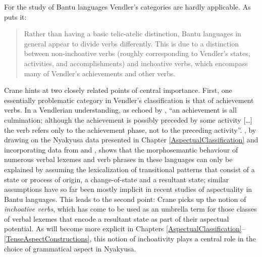 For the study of Bantu languages Vendler's categories are hardly applicable. As \citeauthor{CraneTM2011} puts it:
\begin{quote}Rather than having a basic telic-atelic distinction, Bantu languages in general appear to divide verbs differently. This is due to a distinction between non-inchoative verbs (roughly corresponding to Vendler’s states, activities, and accomplishments) and inchoative verbs, which encompass many of Vendler’s achievements and other verbs. \citep[34]{CraneTM2011}\end{quote}

Crane hints at two closely related points of central importance. First, one essentially problematic category in Vendler's classification is that of achievement verbs. In a Vendlerian understanding, as echoed by \citet[195]{BinnickR1991}, ``an achievement is all culmination; although the achievement is possibly preceded by some activity […] the verb refers only to the achievement phase, not to the preceding activity''. \citet{PersohnB2017b}, by drawing on the Nyakyusa data presented in Chapter \ref{AspectualClassification} and incorporating data from  \citep{KershnerT2002} and  \citep{BotneR2008}, shows that the morphosemantic behaviour of numerous verbal lexemes and verb phrases in these languages can only be explained by assuming the lexicalization of transitional patterns that consist of a state or process of origin, a change-of-state and a resultant state; similar assumptions have so far been mostly implicit in recent studies of aspectuality in Bantu languages. This leads to the second point: Crane picks up the notion of \textit{inchoative verbs}, which has come to be used as an umbrella term for those classes of verbal lexemes that encode a resultant state as part of their aspectual potential. As will become more explicit in Chapters \ref{AspectualClassification}--\ref{TenseAspectConstructions}, this notion of inchoativity plays a central role in the choice of grammatical aspect in Nyakyusa.

